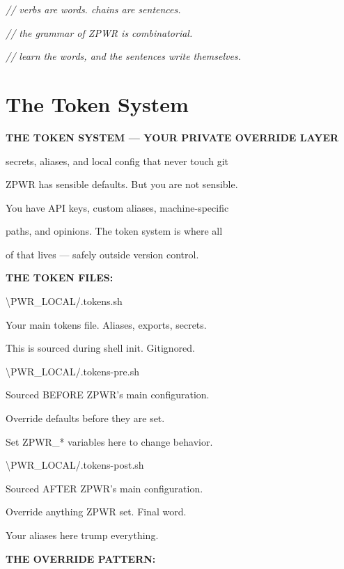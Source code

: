 \documentclass[11pt,a4paper,twoside]{book}
\begin{document}
{\small\itshape\color{dimtext} // verbs are words. chains are sentences.}

{\small\itshape\color{dimtext} // the grammar of ZPWR is combinatorial.}

{\small\itshape\color{dimtext} // learn the words, and the sentences write themselves.}


\vspace{16pt}

\section{The Token System}


\vspace{10pt}
{\large\bfseries\color{neoncyan} THE TOKEN SYSTEM — YOUR PRIVATE OVERRIDE LAYER}\vspace{6pt}

secrets, aliases, and local config that never touch git

ZPWR has sensible defaults. But you are not sensible.

You have API keys, custom aliases, machine-specific

paths, and opinions. The token system is where all

of that lives — safely outside version control.


\vspace{12pt}
{\bfseries\color{neonyellow} THE TOKEN FILES:}\vspace{4pt}

\textbackslash{}PWR\_LOCAL/.tokens.sh

Your main tokens file. Aliases, exports, secrets.

This is sourced during shell init. Gitignored.

\textbackslash{}PWR\_LOCAL/.tokens-pre.sh

Sourced BEFORE ZPWR's main configuration.

Override defaults before they are set.

Set ZPWR\_* variables here to change behavior.

\textbackslash{}PWR\_LOCAL/.tokens-post.sh

Sourced AFTER ZPWR's main configuration.

Override anything ZPWR set. Final word.

Your aliases here trump everything.


\vspace{12pt}
{\bfseries\color{neonyellow} THE OVERRIDE PATTERN:}\vspace{4pt}
\end{document}
